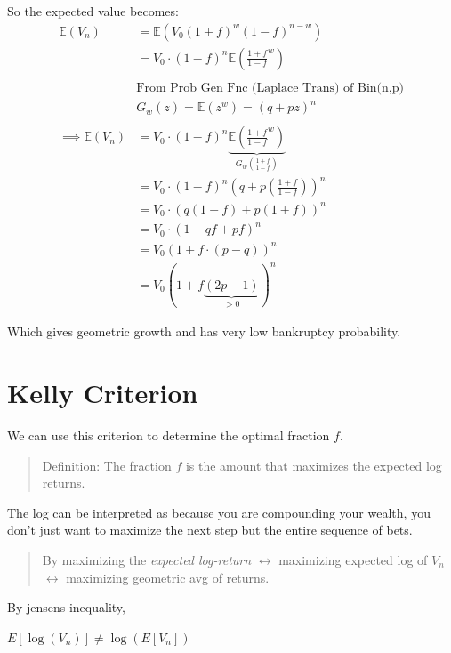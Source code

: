 \documentclass[
  oneside]{book}
\begin{document}
So the expected value becomes:
\[
\begin{aligned}
\mathbb{E}(V_{n}) &= \mathbb{E}(V_{0}(1+f)^{w}(1-f)^{n-w})\\
&= V_{0}\cdot (1-f)^{n}\mathbb{E}\left( \frac{1+f}{1-f}^{w} \right)\\ \\
&\text{From Prob Gen Fnc (Laplace Trans) of Bin(n,p)}\\
&G_{w}(z)= \mathbb{E}(z^{w}) = (q+pz)^{n} \\ \\
\implies \mathbb{E}(V_{n}) &= V_{0}\cdot (1-f)^{n}\underbrace{ \mathbb{E}\left( \frac{1+f}{1-f}^{w} \right) }_{ G_{w}\left( \frac{1+f}{1-f} \right) }\\
&= V_{0}\cdot (1-f)^{n}\left( q+p\left( \frac{1+f}{1-f} \right) \right)^{n}\\
&= V_{0}\cdot \left( q(1-f)+p(1+f) \right)^{n}\\
&= V_{0}\cdot(1-qf+pf)^{n}\\
&= V_{0}(1+f\cdot(p-q))^{n}\\
&= V_{0}(1+f\underbrace{ (2p-1) }_{ >0 })^{n}
\end{aligned}
\]

Which gives geometric growth and has very low bankruptcy probability.

\hypertarget{kelly-criterion}{%
\section{Kelly Criterion}\label{kelly-criterion}}

We can use this criterion to determine the optimal fraction \(f\).

\begin{quote}
Definition: The fraction \(f\) is the amount that maximizes the expected log returns.
\end{quote}

The log can be interpreted as because you are compounding your wealth, you don't just want to maximize the next step but the entire sequence of bets.

\begin{quote}
By maximizing the \emph{expected log-return} \(\leftrightarrow\)
maximizing expected log of \(V_{n}\) \(\leftrightarrow\)
maximizing geometric avg of returns.
\end{quote}

By jensens inequality,

\(E\left[\log \left(V_n\right)\right] \neq \log \left(E\left[V_n\right]\right)\)
\end{document}
